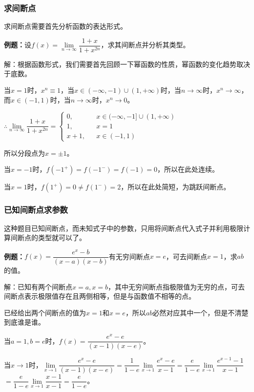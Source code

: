 \subsubsection{求间断点}

求间断点需要首先分析函数的表达形式。

\textbf{例题：}设$f(x)=\lim\limits_{n\to\infty}\dfrac{1+x}{1+x^{2n}}$，求其间断点并分析其类型。

解：根据函数形式，我们需要首先回顾一下幂函数的性质，幂函数的变化趋势取决于底数。

当$x=1$时，$x^n\equiv 1$，当$x\in(-\infty,-1)\cup(1,+\infty)$时，当$n\to\infty$时，$x^n\to\infty$，而$x\in(-1,1)$时，当$n\to\infty$时，$x^n\to 0$。

$\therefore\lim\limits_{n\to\infty}\dfrac{1+x}{1+x^{2n}}=\left\{\begin{array}{lcl}
        0,   &  & x\in(-\infty,-1]\cup(1,+\infty) \\
        1,   &  & x=1                                        \\
        x+1, &  & x\in(-1,1)
    \end{array}
    \right.$

所以分段点为$x=\pm 1$。

当$x=-1$时，$f(-1^+)=f(-1^-)=f(-1)=0$，所以在此处连续。

当$x=1$时，$f(1^+)=0\neq f(1^-)=2$，所以在此处简短，为跳跃间断点。

\subsubsection{已知间断点求参数}

这种题目已知间断点，而未知式子中的参数，只用将间断点代入式子并利用极限计算间断点的类型就可以了。

\textbf{例题：}$f(x)=\dfrac{e^x-b}{(x-a)(x-b)}$有无穷间断点$x=e$，可去间断点$x=1$，求$ab$的值。

解：已知有两个间断点$x=a,x=b$，其中无穷间断点指极限值为无穷的点，可去间断点表示极限值存在且两侧相等，但是与函数值不相等的点。

已经给出两个间断点的值为$x=1$和$x=e$，所以$ab$必然对应其中一个，但是不清楚到底谁是谁。

当$a=1,b=e$时，$f(x)=\dfrac{e^x-e}{(x-1)(x-e)}$。\medskip

当$x\to 1$时，$\lim\limits_{x\to 1}\dfrac{e^x-e}{(x-1)(x-e)}$$=\dfrac{1}{1-e}\lim\limits_{x\to 1}\dfrac{e^x-e}{x-1}$$=\dfrac{e}{1-e}\lim\limits_{x\to 1}\dfrac{e^{x-1}-1}{x-1}$$=\dfrac{e}{1-e}\lim\limits_{x\to 1}\dfrac{x-1}{x-1}$$=\dfrac{e}{1-e}$。\medskip

